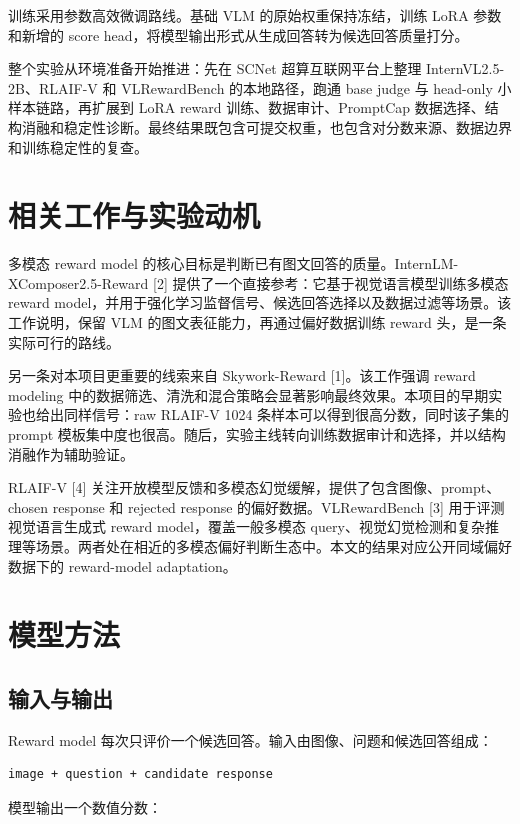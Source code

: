 \documentclass[11pt,a4paper]{ctexart}
\begin{document}
训练采用参数高效微调路线。基础 VLM 的原始权重保持冻结，训练 LoRA 参数和新增的 score head，将模型输出形式从生成回答转为候选回答质量打分。

整个实验从环境准备开始推进：先在 SCNet 超算互联网平台上整理 InternVL2.5-2B、RLAIF-V 和 VLRewardBench 的本地路径，跑通 base judge 与 head-only 小样本链路，再扩展到 LoRA reward 训练、数据审计、PromptCap 数据选择、结构消融和稳定性诊断。最终结果既包含可提交权重，也包含对分数来源、数据边界和训练稳定性的复查。

\section{相关工作与实验动机}

多模态 reward model 的核心目标是判断已有图文回答的质量。InternLM-XComposer2.5-Reward [2] 提供了一个直接参考：它基于视觉语言模型训练多模态 reward model，并用于强化学习监督信号、候选回答选择以及数据过滤等场景。该工作说明，保留 VLM 的图文表征能力，再通过偏好数据训练 reward 头，是一条实际可行的路线。

另一条对本项目更重要的线索来自 Skywork-Reward [1]。该工作强调 reward modeling 中的数据筛选、清洗和混合策略会显著影响最终效果。本项目的早期实验也给出同样信号：raw RLAIF-V 1024 条样本可以得到很高分数，同时该子集的 prompt 模板集中度也很高。随后，实验主线转向训练数据审计和选择，并以结构消融作为辅助验证。

RLAIF-V [4] 关注开放模型反馈和多模态幻觉缓解，提供了包含图像、prompt、chosen response 和 rejected response 的偏好数据。VLRewardBench [3] 用于评测视觉语言生成式 reward model，覆盖一般多模态 query、视觉幻觉检测和复杂推理等场景。两者处在相近的多模态偏好判断生态中。本文的结果对应公开同域偏好数据下的 reward-model adaptation。

\section{模型方法}

\subsection{输入与输出}

Reward model 每次只评价一个候选回答。输入由图像、问题和候选回答组成：

\begin{lstlisting}
image + question + candidate response
\end{lstlisting}

模型输出一个数值分数：
\end{document}
